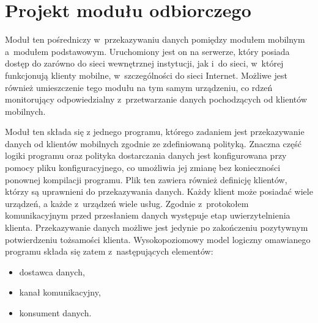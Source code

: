 \section[Projekt modułu odbiorczego][Projekt modułu odbiorczego]{Projekt modułu odbiorczego}
\label{sec:ProjModOdb}

Moduł ten pośredniczy w~przekazywaniu danych pomiędzy modułem mobilnym
a~modułem podstawowym. Uruchomiony jest on na serwerze, który posiada
dostęp do zarówno do sieci wewnętrznej instytucji, jak i~do sieci,
w~której funkcjonują klienty mobilne, w~szczególności do sieci
Internet. Możliwe jest również umieszczenie tego modułu na tym samym
urządzeniu, co rdzeń monitorujący odpowiedzialny z~przetwarzanie
danych pochodzących od klientów mobilnych.

Moduł ten składa się z jednego programu, którego zadaniem jest
przekazywanie danych od klientów mobilnych zgodnie ze zdefiniowaną
polityką. Znaczna część logiki programu oraz polityka dostarczania
danych jest konfigurowana przy pomocy pliku konfiguracyjnego, co
umożliwia jej zmianę bez konieczności ponownej kompilacji
programu. Plik ten zawiera również definicję klientów, którzy są
uprawnieni do przekazywania danych. Każdy klient może posiadać wiele
urządzeń, a każde z~urządzeń wiele usług. Zgodnie z~protokołem
komunikacyjnym przed przesłaniem danych występuje etap
uwierzytelnienia klienta. Przekazywanie danych możliwe jest jedynie po
zakończeniu pozytywnym potwierdzeniu tożsamości
klienta. Wysokopoziomowy model logiczny omawianego programu składa się
zatem z~następujących elementów:

\begin{itemize}
\item dostawca danych,
\item kanał komunikacyjny,
\item konsument danych.
\end{itemize}

